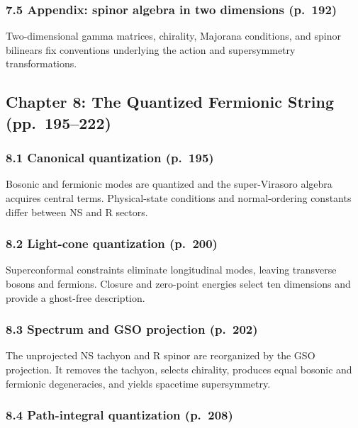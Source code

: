 \documentclass[
  10pt,
  a4paper,
  openany]{book}
\begin{document}
\subsubsection{7.5 Appendix: spinor algebra in two dimensions
(p.~192)}\label{appendix-spinor-algebra-in-two-dimensions-p.-192}

Two-dimensional gamma matrices, chirality, Majorana conditions, and
spinor bilinears fix conventions underlying the action and supersymmetry
transformations.

\subsection{Chapter 8: The Quantized Fermionic String
(pp.~195--222)}\label{chapter-8-the-quantized-fermionic-string-pp.-195222}

\subsubsection{8.1 Canonical quantization
(p.~195)}\label{canonical-quantization-p.-195}

Bosonic and fermionic modes are quantized and the super-Virasoro algebra
acquires central terms. Physical-state conditions and normal-ordering
constants differ between NS and R sectors.

\subsubsection{8.2 Light-cone quantization
(p.~200)}\label{light-cone-quantization-p.-200}

Superconformal constraints eliminate longitudinal modes, leaving
transverse bosons and fermions. Closure and zero-point energies select
ten dimensions and provide a ghost-free description.

\subsubsection{8.3 Spectrum and GSO projection
(p.~202)}\label{spectrum-and-gso-projection-p.-202}

The unprojected NS tachyon and R spinor are reorganized by the GSO
projection. It removes the tachyon, selects chirality, produces equal
bosonic and fermionic degeneracies, and yields spacetime supersymmetry.

\subsubsection{8.4 Path-integral quantization
(p.~208)}\label{path-integral-quantization-p.-208}
\end{document}
